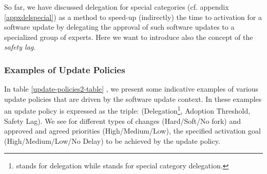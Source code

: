 So far, we have discussed delegation for special categories (cf. appendix \ref{appxdelspecial}) as a method to speed-up (indirectly) the time to activation for a software update by delegating the approval of such software updates to a specialized group of experts. Here we want to introduce also the concept of the \emph{safety lag}. %



\subsubsection{Examples of Update Policies}
 In table \ref{update-policies2-table} 
, we present some indicative examples of various update policies that are driven by the software update context. In these examples an update policy is expressed as the triple: (Delegation\footnote{ stands for delegation while  stands for special category delegation. }, Adoption Threshold, Safety Lag). We see for different types of changes (Hard/Soft/No fork) and approved and agreed priorities (High/Medium/Low), the specified activation goal (High/Medium/Low/No Delay) to be achieved by the update policy.

